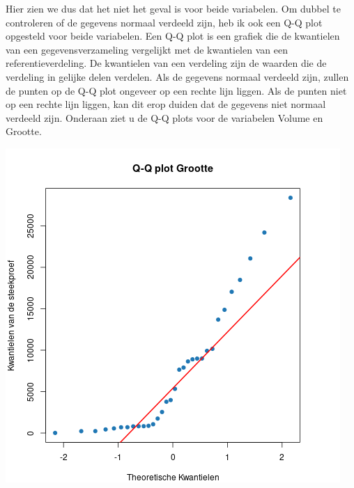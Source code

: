 \documentclass[12pt]{article}
\begin{document}
\newline\newline
Hier zien we dus dat het niet het geval is voor beide variabelen.
\newline\newline
Om dubbel te controleren of de gegevens normaal verdeeld zijn, heb ik ook een Q-Q plot opgesteld voor beide variabelen.
Een Q-Q plot is een grafiek die de kwantielen van een gegevensverzameling vergelijkt met de kwantielen van een referentieverdeling.
De kwantielen van een verdeling zijn de waarden die de verdeling in gelijke delen verdelen.
\newline\newline
Als de gegevens normaal verdeeld zijn, zullen de punten op de Q-Q plot ongeveer op een rechte lijn liggen.
Als de punten niet op een rechte lijn liggen, kan dit erop duiden dat de gegevens niet normaal verdeeld zijn.
Onderaan ziet u de Q-Q plots voor de variabelen Volume en Grootte.
\newline\newline
\noindent\begin{minipage}{0.5\linewidth}
    \centering
    \includegraphics[width=\linewidth]{vragen/vraag1/images/qq_grootte.png}
    \label{fig:qq_grootte}
\end{minipage}
\end{document}
